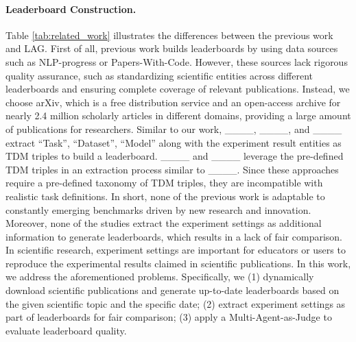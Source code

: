 \paragraph{Leaderboard Construction.}
Table \ref{tab:related_work} illustrates the differences between the previous work and LAG.
First of all, previous work builds leaderboards by using data sources such as NLP-progress or Papers-With-Code. However, these sources lack rigorous quality assurance, such as standardizing scientific entities across different leaderboards and ensuring complete coverage of relevant publications. Instead, we choose arXiv, which is a free distribution service and an open-access archive for nearly 2.4 million scholarly articles in different domains, providing a large amount of publications for researchers.
Similar to our work, ____, ____, and ____ extract ``Task'', ``Dataset'', ``Model'' along with the experiment result entities as TDM triples to build a leaderboard. 
____ and ____ leverage the pre-defined TDM triples in an extraction process similar to ____.  
Since these approaches require a pre-defined taxonomy of TDM triples, they are incompatible with realistic task definitions. In short, none of the previous work is adaptable to constantly emerging benchmarks driven by new research and innovation. 
Moreover, none of the studies extract the experiment settings as additional information to generate leaderboards, which results in a lack of fair comparison. In scientific research, experiment settings are important for educators or users to reproduce the experimental results claimed in scientific publications. 
In this work, we address the
aforementioned problems. Specifically, we (1) dynamically download scientific publications and generate up-to-date leaderboards based on the given scientific topic and the specific date; (2) extract experiment settings as part of leaderboards for fair comparison; (3) apply a Multi-Agent-as-Judge to evaluate leaderboard quality.